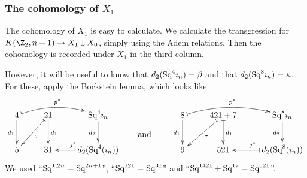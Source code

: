 \documentclass[11pt]{article}
\newcommand{\Squ}{\textup{Sq}}
\theoremstyle{plain}
\theoremstyle{definition}
\begin{document}

\subsubsection{\texorpdfstring{The cohomology of $X_1$}{The cohomology of X1}}
The cohomology of $X_1$ is easy to calculate. We calculate the transgression 
for $K(\Z_2,n+1)\rightarrow X_1\downarrow X_0$, simply using the Adem relations.
Then the cohomology is recorded under $X_1$ in the third column.

However, it will be useful to know that $d_2(\Squ^4\imath_n)=\beta$ and that
$d_2(\Squ^8\imath_n)=\kappa$. For these, apply the Bockstein lemma, which looks
like
\[\xymatrix{
4\ar@{|->}[d]_{d_1}\ar@{|->}@/^.81pc/[rr]^{p^*}&
21\ar@{|->}[ld]^\tau\ar@{|->}[d]^{d_1}&
\Squ^4\imath_n\ar@{|->}[d]_{d_{2}}\\
5&
31&d_2(\Squ^4(\imath_n))\ar@{|->}[l]_{j^*}
}
\raisebox{-.8cm}{\qquad and\qquad\ }
\xymatrix{
8\ar@{|->}[d]_{d_1}\ar@{|->}@/^.81pc/[rr]^{p^*}&
421+7\ar@{|->}[ld]^\tau\ar@{|->}[d]^{d_1}&
\Squ^8\imath_n\ar@{|->}[d]_{d_{2}}\\
9&
521&d_2(\Squ^8(\imath_n))\ar@{|->}[l]_{j^*}
}
\]
We used ``$\Squ^{1,2n}=\Squ^{2n+1}$'', ``$\Squ^{121}=\Squ^{31}$'' and
``$\Squ^{1421}+\Squ^{17}=\Squ^{521}$''.
\end{document}
